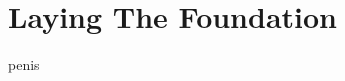
\begin{comment}
  what to do what to do what to do.
  In this section should talk about what we did for our infrastructure, what decisions we made, what we thought we would need to factor in later on.
  
things to talk about:
  - what is infrastructure
  - why infrastructure is soo important
    - it is the skelenton of the program
    - once infrastructure is in place, it defines what is easy to change, and what can't change without major refactor
  - infrastructure components
    - networking
    - gameploop
    - how the server and client synchronize
    - graphics
\end{comment}
    
\section{Laying The Foundation}
    
    
    


 
penis